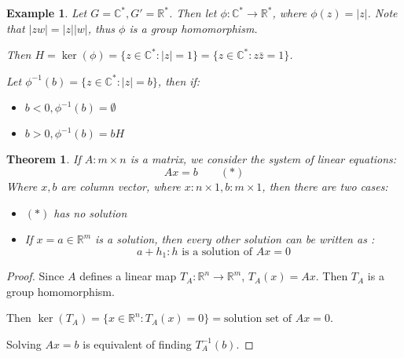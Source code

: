 \documentclass{article}
\theoremstyle{MyNonumberplain}
\theoremstyle{break}
\newtheorem*{proof}{Proof. }
\newcommand{\p}{\phi}
\theoremstyle{break}
\newtheorem{theorem}{Theorem}[section]
\newtheorem{example}{Example}[section]
\theoremstyle{break}
\theoremstyle{definition}
\theoremstyle{break}
\begin{document}
\begin{expbox}
    \begin{example}
        Let $G =\mathbb{C}^{\ast}, G' =\mathbb{R}^{\ast}$. Then let $\p :
        \mathbb{C}^{\ast} \rightarrow \mathbb{R}^{\ast}$, where $\p (z) = | z |$. Note
        that $| z w | = | z | | w |$, thus $\p$ is a group homomorphism.\bigskip

        Then $H = \ker \left( \p \right) = \{ z \in \mathbb{C}^{\ast} : | z | = 1 \}
        = \{ z \in \mathbb{C}^{\ast} : z \bar{z} = 1 \}$.\bigskip

        Let $\p^{- 1} (b) = \{ z \in \mathbb{C}^{\ast} : | z | = b \}$, then if:\\
        \begin{itemize}
        \item $b < 0, \p^{- 1} (b) = \emptyset$\\
        
        \item $b > 0, \p^{- 1} (b) = b H$
        \end{itemize}
    \end{example}
\end{expbox}

\begin{thmbox}
    \begin{theorem}
        If $A : m \times n$ is a matrix, we consider the system of linear equations:
        \[ A x = b \qquad (\ast) \]
        Where $x, b$ are column vector, where $x : n \times 1, b : m \times 1$, then
        there are two cases:\\
        \begin{itemize}
        \item $(\ast)$ has no solution\\
        
        \item If $x = a \in \mathbb{R}^m$ is a solution, then every other solution
        can be written as :
        \[ a + h_1 : h \text{ is a solution of $A x = 0$} \]
        \end{itemize}
    \end{theorem}
    \begin{prfbox}
        \begin{proof}
            Since $A$ defines a linear map $T_A : \mathbb{R}^n \rightarrow
            \mathbb{R}^m$, $T_A (x) = A x$. Then $T_A$ is a group homomorphism.\bigskip

            Then $\ker (T_A) = \{ x \in \mathbb{R}^n : T_A (x) = 0 \} = \text{solution set
            of $A x = 0$}$.\bigskip

            Solving $A x = b$ is equivalent of finding $T^{- 1}_A (b)$. 
        \end{proof}
    \end{prfbox}
\end{thmbox}
\end{document}
